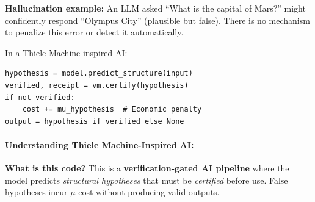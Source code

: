 \textbf{Hallucination example:} An LLM asked ``What is the capital of Mars?'' might confidently respond ``Olympus City'' (plausible but false). There is no mechanism to penalize this error or detect it automatically.

In a Thiele Machine-inspired AI:
\begin{lstlisting}
hypothesis = model.predict_structure(input)
verified, receipt = vm.certify(hypothesis)
if not verified:
    cost += mu_hypothesis  # Economic penalty
output = hypothesis if verified else None
\end{lstlisting}

\paragraph{Understanding Thiele Machine-Inspired AI:}

\textbf{What is this code?} This is a \textbf{verification-gated AI pipeline} where the model predicts \textit{structural hypotheses} that must be \textit{certified} before use. False hypotheses incur $\mu$-cost without producing valid outputs.

